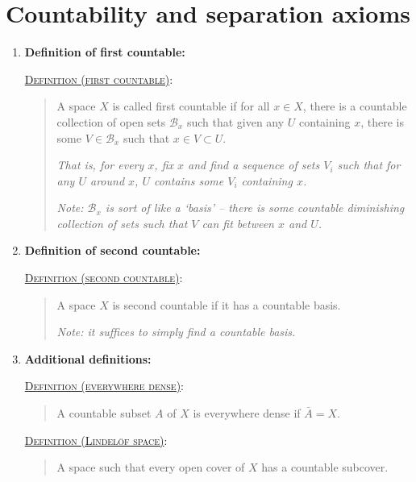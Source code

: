 \documentclass[letterpaper, 12pt]{article}
\newcommand{\ms}[1]{\mathscr{#1}}
\newcommand{\defn}[2]{\textsc{\underline{Definition (#1)}:}\begin{quote} #2\end{quote}}
\begin{document}
\section{Countability and separation axioms}
    \begin{enumerate}[resume]
    \item \textbf{Definition of first countable:}

    \defn{first countable}{A space $X$ is called first countable if for all $x\in X$, there is a countable collection of open sets $\ms{B}_x$ such that given any $U$ containing $x$, there is some $V\in\ms{B}_x$ such that $x\in V\subset U$.

    \textit{That is, for every $x$, fix $x$ and find a sequence of sets $V_i$ such that for any $U$ around $x$, $U$ contains some $V_i$ containing $x$.}

    \textit{Note: $\ms{B}_x$ is sort of like a `basis' -- there is some countable diminishing collection of sets such that $V$ can fit between $x$ and $U$.}}
    \item \textbf{Definition of second countable:}

    \defn{second countable}{A space $X$ is second countable if it has a countable basis.

    \textit{Note: it suffices to simply find a countable basis.}}
    \item \textbf{Additional definitions:}

    \defn{everywhere dense}{A countable subset $A$ of $X$ is everywhere dense if $\bar{A} = X$.}

    \defn{Lindel\"of space}{A space such that every open cover of $X$ has a countable subcover.}


\end{enumerate}
\end{document}
